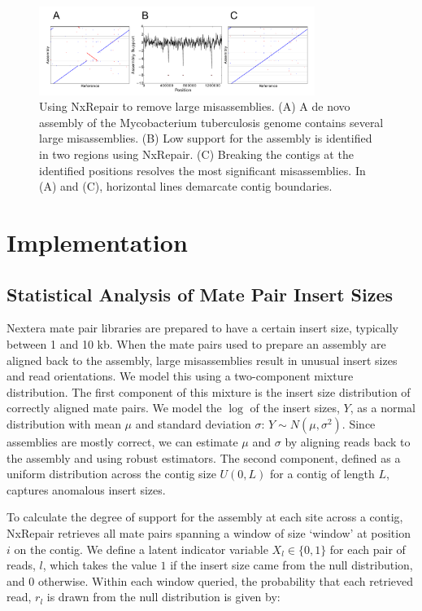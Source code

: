 \documentclass[fleqn,10pt]{wlpeerj}
\begin{document}
\begin{figure}
\centerline{\includegraphics[width=0.8\textwidth]{fig1_nxrepair.pdf}}
\caption{Using NxRepair to remove large misassemblies. (A) A de novo assembly of the Mycobacterium tuberculosis genome contains several large misassemblies. (B) Low support for the assembly is identified in two regions using NxRepair. (C) Breaking the contigs at the identified positions resolves the most significant misassemblies. In (A) and (C), horizontal lines demarcate contig boundaries.}\label{fig:NxRepair}
\end{figure}

\section*{Implementation}
\subsection*{Statistical Analysis of Mate Pair Insert Sizes}
Nextera mate pair libraries are prepared to have a certain insert size, typically between 1 and 10 kb. When the mate pairs used to prepare an assembly are aligned back to the assembly, large misassemblies result in unusual insert sizes and read orientations. We model this using a two-component mixture distribution. The first component of this mixture is the insert size distribution of correctly aligned mate pairs.  We model the $\log$ of the insert sizes, $Y$, as a normal distribution with mean $\mu$ and standard deviation $\sigma$: $Y \sim N(\mu,\sigma^2).$ Since assemblies are mostly correct, we can estimate $\mu$ and $\sigma$ by aligning reads back to the assembly and using robust estimators. The second component, defined as a uniform distribution across the contig size $U(0,L)$ for a contig of length $L$, captures anomalous insert sizes.

To calculate the degree of support for the assembly at each site across a contig, NxRepair retrieves all mate pairs spanning a window of size `window' at position $i$ on the contig. We define a latent indicator variable $X_l\in\{0,1\}$ for each pair of reads, $l$, which takes the value $1$ if the insert size came from the null distribution, and $0$ otherwise. Within each window queried, the probability that each retrieved read, $r_l$ is drawn from the null distribution is given by:
\end{document}
